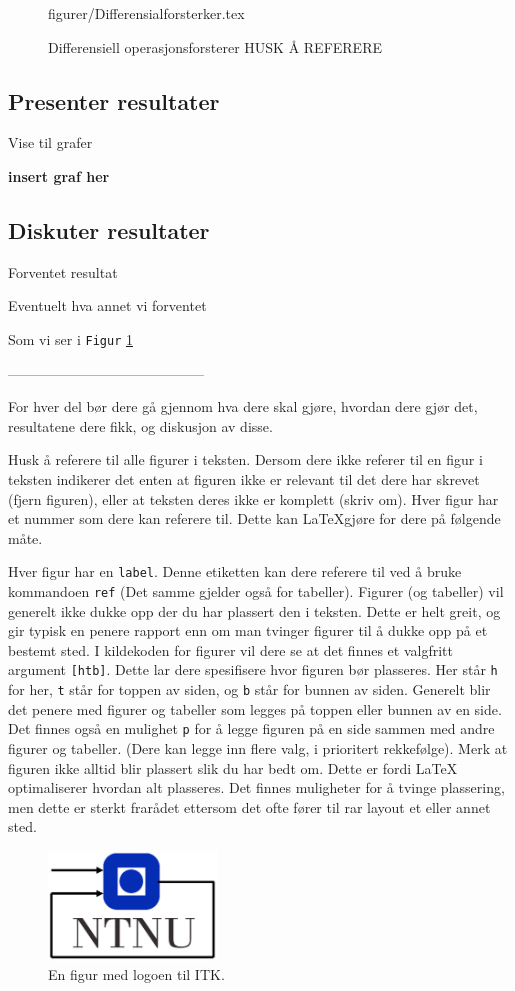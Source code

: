 \begin{figure} [h]
     {figurer/Differensialforsterker.tex}
    \caption{Differensiell operasjonsforsterer HUSK Å REFERERE}
    \label{fig:differensialforsterker}
\end{figure}


\subsection{Presenter resultater}
Vise til grafer

\textbf{insert graf her}



\subsection{Diskuter resultater}

Forventet resultat

Eventuelt hva annet vi forventet

Som vi ser i \texttt{Figur} \ref{fig:differensialforsterker}


------------------------------------------


For hver del bør dere gå gjennom hva dere skal gjøre, hvordan dere gjør det, resultatene dere fikk,
og diskusjon av disse. 

Husk å referere til alle figurer i teksten. Dersom dere ikke referer til en 
figur i teksten indikerer det enten at figuren ikke er relevant til det dere
har skrevet (fjern figuren), eller at teksten deres ikke er komplett (skriv om).
Hver figur har et nummer som dere kan referere til. Dette kan \LaTeX gjøre for dere
på følgende måte. 



Hver figur har en \texttt{label}. Denne etiketten kan dere
referere til ved å bruke kommandoen \texttt{ref} (Det samme gjelder også for tabeller).
Figurer (og tabeller) vil generelt ikke dukke opp der du har plassert den i teksten.
Dette er helt greit, og gir typisk en penere rapport enn om man tvinger figurer til å dukke opp på et bestemt sted. I kildekoden for figurer vil dere se at det finnes et
valgfritt argument \verb+[htb]+. Dette lar dere spesifisere hvor figuren bør plasseres. Her står \verb+h+ for her, \verb+t+ står for toppen av siden, og \verb+b+
står for bunnen av siden. Generelt blir det penere med figurer og tabeller som legges på toppen eller bunnen av en side. Det finnes også en mulighet \verb+p+ for å legge figuren på en side sammen med andre figurer og tabeller. (Dere kan legge inn flere valg, i prioritert rekkefølge). Merk at figuren ikke alltid blir plassert slik du har bedt om. Dette er fordi LaTeX optimaliserer hvordan alt plasseres. Det finnes muligheter for å tvinge plassering, men dette er sterkt frarådet ettersom det ofte fører til rar layout et eller annet sted.




\begin{figure}[b]
	\centering
	\includegraphics[width=0.40\textwidth]{figurer/itk_ntnu.jpg}
	\caption{En figur med logoen til ITK.}
\label{fig:layers_openloop}
\end{figure}
